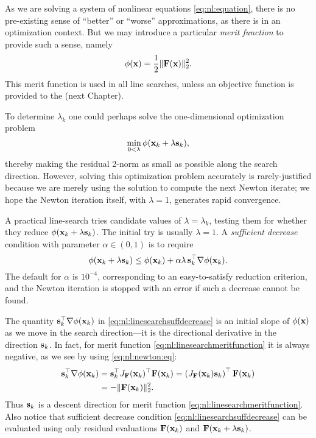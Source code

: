 As we are solving a system of nonlinear equations \eqref{eq:nl:equation}, there is no pre-existing sense of ``better'' or ``worse'' approximations, as there is in an optimization context.  But we may introduce a particular \emph{merit function} \citep{NocedalWright2006} to provide such a sense, namely
\begin{equation}
\phi(\mathbf{x}) = \frac{1}{2} \|\mathbf{F}(\mathbf{x})\|_2^2.  \label{eq:nl:linesearchmeritfunction}
\end{equation}
This merit function is used in all \pSNES line searches, unless an objective function is provided to the \pSNES (next Chapter).

To determine $\lambda_k$ one could perhaps solve the one-dimensional optimization problem
\begin{equation}
\min_{0<\lambda} \phi(\mathbf{x}_k + \lambda \mathbf{s}_k),  \label{eq:nl:linesearchperhapsopt}
\end{equation}
thereby making the residual 2-norm as small as possible along the search direction.  However, solving this optimization problem accurately is rarely-justified because we are merely using the solution to compute the next Newton iterate; we hope the Newton iteration itself, with $\lambda=1$, generates rapid convergence.

A practical line-search tries candidate values of $\lambda=\lambda_k$, testing them for whether they reduce $\phi(\mathbf{x}_k + \lambda \mathbf{s}_k)$.  The initial try is usually $\lambda=1$.  A \emph{sufficient  decrease} condition with parameter $\alpha\in(0,1)$ is to require
\begin{equation}
\phi(\mathbf{x}_k + \lambda \mathbf{s}_k) \le \phi(\mathbf{x}_k) + \alpha \lambda\, \mathbf{s}_k^\top \nabla \phi(\mathbf{x}_k).  \label{eq:nl:linesearchsuffdecrease}
\end{equation}
The \PETSc default for $\alpha$ is $10^{-4}$, corresponding to an easy-to-satisfy reduction criterion, and the Newton iteration is stopped with an error if such a decrease cannot be found.

The quantity $\mathbf{s}_k^\top \nabla \phi(\mathbf{x}_k)$ in \eqref{eq:nl:linesearchsuffdecrease} is an initial slope of $\phi(\mathbf{x})$ as we move in the search direction---it is the directional derivative in the direction $\mathbf{s}_k$.  In fact, for merit function \eqref{eq:nl:linesearchmeritfunction} it is always negative, as we see by using \eqref{eq:nl:newton:eq}:
\begin{align}
\mathbf{s}_k^\top \nabla \phi(\mathbf{x}_k) &= \mathbf{s}_k^\top J_{\mathbf{F}}(\mathbf{x}_k)^\top \mathbf{F}(\mathbf{x}_k) = \left(J_{\mathbf{F}}(\mathbf{x}_k) \mathbf{s}_k\right)^\top \mathbf{F}(\mathbf{x}_k) \label{eq:nl:linesearchinitslope} \\
  &= - \|\mathbf{F}(\mathbf{x}_k)\|_2^2. \notag
\end{align}
Thus $\mathbf{s}_k$ is a descent direction for merit function \eqref{eq:nl:linesearchmeritfunction}.  Also notice that sufficient decrease condition \eqref{eq:nl:linesearchsuffdecrease} can be evaluated using only residual evaluations $\mathbf{F}(\mathbf{x}_k)$ and $\mathbf{F}(\mathbf{x}_k + \lambda \mathbf{s}_k)$.

